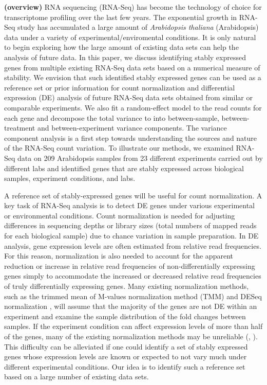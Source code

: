 \documentclass[11pt, a4paper]{article}
\begin{document}
\textbf{(overview)}
RNA sequencing (RNA-Seq) has become the technology of choice for transcriptome
profiling over the last few years. The exponential growth in RNA-Seq study has
accumulated a large amount of \textit{Arabidopsis thaliana} (Arabidopsis) data under a variety of
experimental/enviromental conditions.  It is only natural to begin exploring
how the large amount of existing data sets can help the analysis of future
data.  In this paper, we discuss identifying stably expressed genes from
multiple existing RNA-Seq data sets based on a numerical measure of stability.
We envision that such identified stably expressed genes can be used as a
reference set or prior information for count normalization and differential
expression (DE) analysis of future RNA-Seq data sets obtained from similar or
comparable experiments.  We also fit a random-effect model to the read counts
for each gene and decompose the total variance to into between-sample,
between-treatment and between-experiment variance components. The variance component
analysis is a first step towards understanding the sources and nature of the
RNA-Seq count variation.  To illustrate our methods, we examined RNA-Seq data
on 209 Arabidopsis  samples from 23 different experiments carried out by
different labs and identified genes that are stably expressed across
biological samples, experiment conditions, and labs.  

A reference set of stably-expressed genes will be useful for count
normalization.  A key task of RNA-Seq analysis is to detect DE genes under
various experimental or environmental conditions. Count normalization is
needed for adjusting differences in sequencing depths or library sizes (total
numbers of mapped reads for each biological sample) due to chance variation in
sample preparation.  In DE analysis, gene expression levels are often
estimated from relative read frequencies. For this reason, normalization is
also needed to account for the apparent reduction or increase in relative read
frequencies of non-differentially expressing genes simply to accommodate the
increased or decreased relative read frequencies of truly differentially
expressing genes.  Many existing normalization methods, such as the trimmed
mean of M-values normalization method (TMM) \citep{robinson2010scaling} and
DESeq normalization \citep{anders2010differential}, will  assume that the
majority of the genes are not DE within an experiment and examine the sample
distribution of the fold changes between samples.
If the experiment condition can affect expression levels of more than half of
the genes, many of the existing normalization methods may be unreliable
(\cite{loven2012revisiting}, \cite{wu2013use}).  This difficulty can be
alleviated if one could identify a set of stably expressed genes whose
expression levels are known or expected to not vary much under different
experimental conditions. Our idea is to identify such a reference set based on
a large number of existing data sets.
\end{document}
